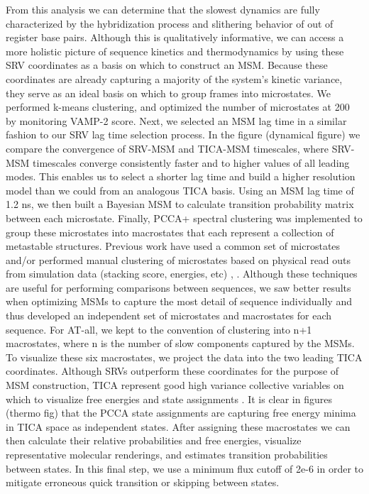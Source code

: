 \documentclass[journal=jpcbfk,manuscript=article]{achemso}
\begin{document}
From this analysis we can determine that the slowest dynamics are fully characterized by the hybridization process and slithering behavior of out of register base pairs. Although this is qualitatively informative, we can access a more holistic picture of sequence kinetics and thermodynamics by using these SRV coordinates as a basis on which to construct an MSM. Because these coordinates are already capturing a majority of the system's kinetic variance, they serve as an ideal basis on which to group frames into microstates. We performed k-means clustering, and optimized the number of microstates at 200 by monitoring VAMP-2 score. Next, we selected an MSM lag time in a similar fashion to our SRV lag time selection process. In the figure (dynamical figure) we compare the convergence of SRV-MSM and TICA-MSM timescales, where SRV-MSM timescales converge consistently faster and to higher values of all leading modes. This enables us to select a shorter lag time and build a higher resolution model than we could from an analogous TICA basis. Using an MSM lag time of 1.2 ns, we then built a Bayesian MSM to calculate transition probability matrix between each microstate. Finally, PCCA+ spectral clustering was implemented to group these microstates into macrostates that each represent a collection of metastable structures. Previous work have used a common set of microstates and/or performed manual clustering of microstates based on physical read outs from simulation data (stacking score, energies, etc) \citep{Pinamonti2017PredictingModels}, \citep{PinamontiAnalyzedModels}. Although these techniques are useful for performing comparisons between sequences, we saw better results when optimizing MSMs to capture the most detail of sequence individually and thus developed an independent set of microstates and macrostates for each sequence. For AT-all, we kept to the convention of clustering into n+1 macrostates, where n is the number of slow components captured by the MSMs. To visualize these six macrostates, we project the data into the two leading TICA coordinates. Although SRVs outperform these coordinates for the purpose of MSM construction, TICA represent good high variance collective variables on which to visualize free energies and state assignments \citep{Sidky}. It is clear in figures (thermo fig) that the PCCA state assignments are capturing free energy minima in TICA space as independent states. After assigning these macrostates we can then calculate their relative probabilities and free energies, visualize representative molecular renderings, and estimates transition probabilities between states. In this final step, we use a minimum flux cutoff of 2e-6 in order to mitigate erroneous quick transition or skipping between states. 
\end{document}

